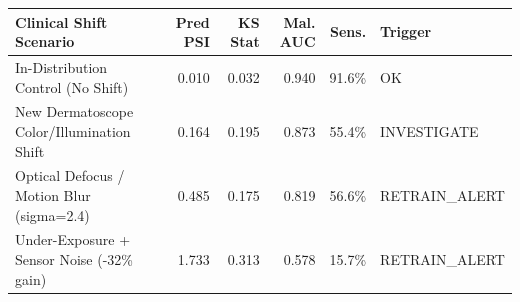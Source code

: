 \begin{tabular}{lrrrrl}
\toprule
\textbf{Clinical Shift Scenario} & \textbf{Pred PSI} & \textbf{KS Stat} & \textbf{Mal. AUC} & \textbf{Sens.} & \textbf{Trigger} \\
\midrule
In-Distribution Control (No Shift) & 0.010 & 0.032 & 0.940 & 91.6\% & OK \\
New Dermatoscope Color/Illumination Shift & 0.164 & 0.195 & 0.873 & 55.4\% & INVESTIGATE \\
Optical Defocus / Motion Blur (sigma=2.4) & 0.485 & 0.175 & 0.819 & 56.6\% & RETRAIN\_ALERT \\
Under-Exposure + Sensor Noise (-32\% gain) & 1.733 & 0.313 & 0.578 & 15.7\% & RETRAIN\_ALERT \\
\bottomrule
\end{tabular}
